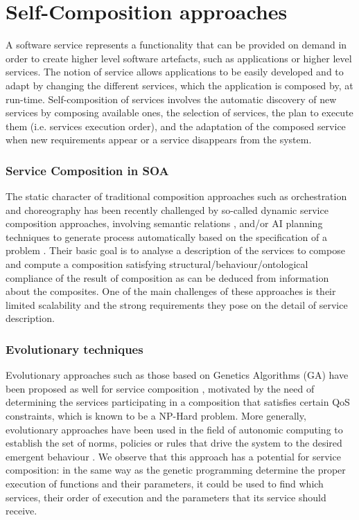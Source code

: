 \documentclass[12pt,a4paper,twoside,openright]{book}
\begin{document}
\section{Self-Composition approaches}
A software service represents a functionality that can be provided on demand in order to create higher level software artefacts, such as applications or higher level services.
%
The notion of service allows applications to be easily developed and to adapt by changing the different services, which the application is composed by, at run-time. 
%
Self-composition of services involves the automatic discovery of new services by composing available ones, the selection of services, the plan to execute them (i.e. services execution order), and the adaptation of the composed service when new requirements appear or a service disappears from the system.

\subsubsection{Service Composition in SOA}
The static character of traditional composition approaches such as orchestration and choreography has been recently challenged by so-called dynamic service composition approaches, involving semantic relations \cite{terBeek:06:ASSCFISFM}, and/or AI planning techniques to generate process automatically based on the specification of a problem \cite{wu2007automatic}. 
%
Their basic goal is to analyse a description of the services to compose and compute a composition satisfying structural/behaviour/ontological compliance of the result of composition as can be deduced from information about the composites.
%
One of the main challenges of these approaches is their limited scalability and the strong requirements they pose on the detail of service description.

\subsubsection{Evolutionary techniques}
Evolutionary approaches such as those based on Genetics Algorithms (GA) have been proposed as well for service composition \cite{Canfora2005}, motivated by the need of determining the services participating in a composition that satisfies certain QoS constraints, which is known to be a NP-Hard problem.
%
More generally, evolutionary approaches have been used in the field of autonomic computing to establish the set of norms, policies or rules that drive the system to the desired emergent behaviour \cite{Norman2010}.
%
We observe that this approach has a potential for service composition: in the same way as the genetic programming determine the proper execution of functions and their parameters, it could be used to find which services, their order of execution and the parameters that its service should receive. 
\end{document}
